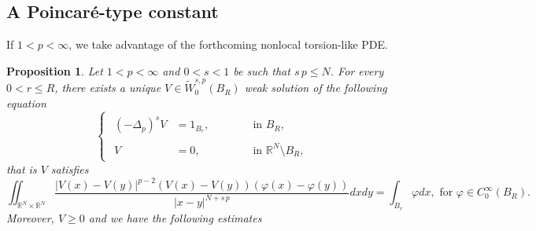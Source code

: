 \documentclass{amsart}
\newtheorem{proposition}[theorem]{Proposition}
\theoremstyle{definition}
\numberwithin{equation}{section}
\begin{document}
\subsection{A Poincar\'e-type constant}
If $1 < p < \infty$, we take advantage of the forthcoming nonlocal torsion-like PDE.  
\begin{proposition}\label{cor:Linfty-bound}
	Let $1 < p< \infty$ and $0 < s < 1$ be such that $s\,p \le N$. For every $0 < r \le R$, there exists a unique $V \in \widetilde{W}^{s,p}_0(B_R)$ weak solution of the following equation
	\begin{equation*} \label{euler-lagrange-torsion}
		\begin{cases}
			\begin{aligned}
				(-\Delta_p)^s V &= 1_{B_r}, \qquad &&\mbox{ in } B_R,\\
				\\
				V &=0, \qquad &&\mbox{ in } \mathbb{R}^N \setminus B_R,
			\end{aligned}
		\end{cases}
	\end{equation*}
		that is $V$ satisfies
	\begin{equation} \label{eqn-statement}
		\iint_{\mathbb{R}^N \times \mathbb{R}^N} \frac{|V(x) - V(y)|^{p-2}(V(x) - V(y))(\varphi(x) - \varphi(y))}{|x-y|^{N+s\,p}}dxdy = \int_{B_r} \varphi dx, \mbox{ for } \varphi \in C^\infty_0(B_R).
	\end{equation}
	Moreover, $V \ge 0$ and we have the following estimates
\end{proposition}
\end{document}
